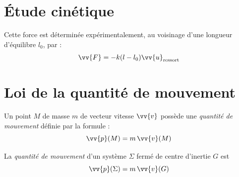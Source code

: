 \documentclass[11pt,a4paper,fleqn,pdftex]{report}
\begin{document}
\section{Étude cinétique}
\begin{dfn}
\begin{minipage}{0.6\textwidth}
Cette force est déterminée expérimentalement, au voisinage d'une longueur d'équilibre $l_0$, par :
\begin{equation}
\vv{F} = -k(l-l_0)\vv{u}_\text{ressort}
\end{equation}
\end{minipage}\hspace{0.1\textwidth}
\begin{minipage}{0.3\textwidth}
\end{minipage}
\end{dfn}
\section{Loi de la quantité de mouvement} %
\label{sec:loi_de_la_quantite_de_mouvement}
\begin{dfn}
   Un point $M$ de masse $m$ de vecteur vitesse $\vv{v}$ possède une \emph{quantité de mouvement} définie par la formule : 
   \begin{equation}
   \vv{p}(M) = m\,\vv{v}(M)
   \end{equation}
\end{dfn}
\begin{theorem}
   La \emph{quantité de mouvement} d'un système $\Sigma$ fermé de centre d'inertie $G$ est
   \begin{equation}
   \vv{p}(\Sigma )= m\,\vv{v}(G)
   \end{equation}
\end{theorem}
\end{document}
